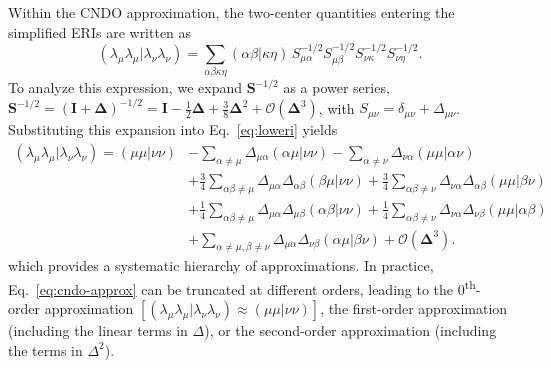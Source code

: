 \documentclass[%
 aip,
 amsmath,amssymb,
preprint,%
]{revtex4-2}
\begin{document}
Within the CNDO approximation, the two-center quantities entering the simplified ERIs are written as
\begin{equation}
	(\lambda_\mu\lambda_\mu|\lambda_\nu\lambda_\nu)
	= \sum_{\alpha\beta\kappa\eta} (\alpha\beta|\kappa\eta)\,
	S^{-1/2}_{\mu\alpha}S^{-1/2}_{\mu\beta}S^{-1/2}_{\nu\kappa}S^{-1/2}_{\nu\eta}.
	\label{eq:loweri}
\end{equation}
To analyze this expression, we expand $\mathbf S^{-1/2}$ as a power series,
$\mathbf S^{-1/2} = (\mathbf I + \bm\Delta)^{-1/2}
= \mathbf I - \tfrac{1}{2}\bm\Delta + \frac{3}{8}\bm\Delta^2 + \mathcal{O}(\bm\Delta^3)$,
with $S_{\mu\nu} = \delta_{\mu\nu} + \Delta_{\mu\nu}$.  
Substituting this expansion into Eq.~\eqref{eq:loweri} yields
\begin{align}
	(\lambda_\mu\lambda_\mu|\lambda_\nu\lambda_\nu)  = (\mu\mu|\nu\nu) &-\sum_{\alpha\neq\mu} \Delta_{\mu\alpha} (\alpha\mu|\nu\nu) -\sum_{\alpha\neq\nu} \Delta_{\nu\alpha} (\mu\mu|\alpha\nu)\nonumber\\
	&+\frac{3}{4}\sum_{\alpha\beta\neq \mu} \Delta_{\mu\alpha}\Delta_{\alpha\beta} (\beta\mu|\nu\nu)+\frac{3}{4}\sum_{\alpha\beta\neq \nu} \Delta_{\nu\alpha}\Delta_{\alpha\beta} (\mu\mu|\beta\nu) \nonumber\\
	&+\frac{1}{4}\sum_{\alpha\beta\neq \mu} \Delta_{\mu\alpha}\Delta_{\mu\beta} (\alpha\beta|\nu\nu)+\frac{1}{4}\sum_{\alpha\beta\neq \nu} \Delta_{\nu\alpha}\Delta_{\nu\beta} (\mu\mu|\alpha\beta) \nonumber\\
	&+\sum_{\alpha\neq\mu,\beta\neq\nu} \Delta_{\mu\alpha}\Delta_{\nu\beta} (\alpha\mu|\beta\nu) + \mathcal{O}(\bm\Delta^3).
	\label{eq:cndo-approx}
\end{align}
which provides a systematic hierarchy of approximations.  
In practice, Eq.~\eqref{eq:cndo-approx} can be truncated at different orders, leading to the 0\textsuperscript{th}-order approximation 
$[(\lambda_\mu\lambda_\mu|\lambda_\nu\lambda_\nu) \approx (\mu\mu|\nu\nu)]$, 
the first-order approximation (including the linear terms in $\Delta$), 
or the second-order approximation (including the terms in $\Delta^2$).
\end{document}
